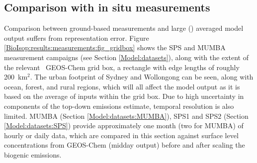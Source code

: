     
%      
%      

  
  \subsection{Comparison with in situ measurements}
    \label{BioIsop:results:measurements}
    
    Comparison between ground-based measurements and large (\lowhr) averaged model output suffers from representation error.
    Figure \ref{BioIsop:results:measurements:fig_gridbox} shows the SPS and MUMBA measurement campaigns (see Section \ref{Model:datasets}), along with the extent of the relevant \lowhr ~GEOS-Chem grid box, a rectangle with edge lengths of roughly 200~km$^{2}$.
    The urban footprint of Sydney and Wollongong can be seen, along with ocean, forest, and rural regions, which will all affect the model output as it is based on the average of inputs within the grid box.
    Due to high uncertainty in components of the top-down emissions estimate, temporal resolution is also limited.
    MUMBA (Section \ref{Model:datasets:MUMBA}), SPS1 and SPS2 (Section \ref{Model:datasets:SPS}) provide approximately one month (two for MUMBA) of hourly or daily data, which are compared in this section against surface level concentrations from GEOS-Chem (midday output) before and after scaling the biogenic emissions.
    
